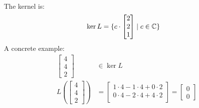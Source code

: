 \begin{example}
\begin{align*}
    \end{align*}
    The kernel is:
    \begin{align*}
        \ker L & = \{
            c \cdot \begin{bmatrix}
                2 \\ 2 \\ 1
            \end{bmatrix}
         \mid c \in \mathbb{C}  \}
    \end{align*}
    A concrete example:
    \begin{align*}
        \begin{bmatrix}
            4 \\ 4 \\ 2
        \end{bmatrix}                 & \in \ker L                                                \\
        L \left(\begin{bmatrix}
            4 \\ 4 \\ 2
        \end{bmatrix} \right) & = \begin{bmatrix}
            1 \cdot 4  -1 \cdot 4  + 0 \cdot 2 \\
            0 \cdot 4  -2 \cdot 4 + 4 \cdot 2  \\
        \end{bmatrix} = \begin{bmatrix}
            0 \\ 0
        \end{bmatrix} \\
    \end{align*}
    \begin{example}

    \end{example}

\end{example}
